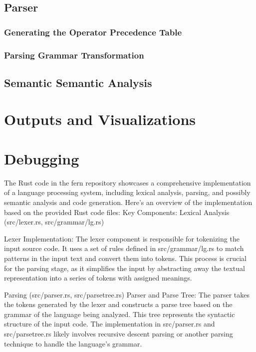 \subsection{Parser}
\subsubsection{Generating the Operator Precedence Table}
\subsubsection{Parsing Grammar Transformation} \label{parsing_grammar_transformation}
\subsection{Semantic Semantic Analysis}

\section{Outputs and Visualizations} \label{outputs_and_visualizations}

\section{Debugging} \label{debugging}

The Rust code in the fern repository showcases a comprehensive implementation of
a language processing system, including lexical analysis, parsing, and possibly
semantic analysis and code generation. Here's an overview of the implementation
based on the provided Rust code files: Key Components:
Lexical Analysis (src/lexer.rs, src/grammar/lg.rs)

    Lexer Implementation: The lexer component is responsible for tokenizing
the input source code. It uses a set of rules defined in src/grammar/lg.rs to
match patterns in the input text and convert them into tokens. This process is
crucial for the parsing stage, as it simplifies the input by abstracting away
the textual representation into a series of tokens with assigned meanings.

Parsing (src/parser.rs, src/parsetree.rs)
    Parser and Parse Tree: The parser takes the tokens generated by the lexer
    and constructs a parse tree based on the grammar of the language being
    analyzed. This tree represents the syntactic structure of the input code.
    The implementation in src/parser.rs and src/parsetree.rs likely involves
    recursive descent parsing or another parsing technique to handle the
    language's grammar.

